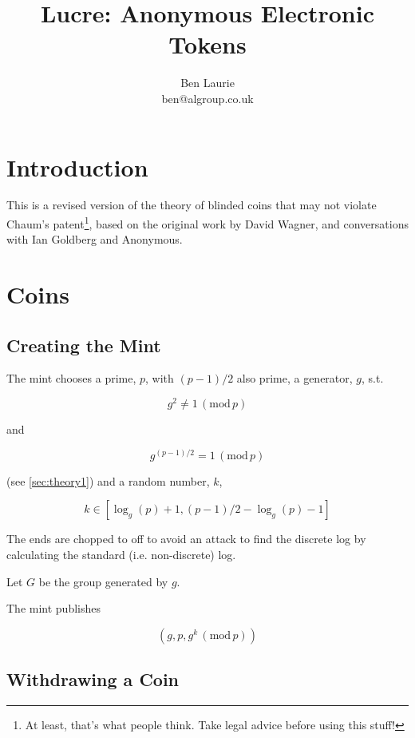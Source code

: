 \documentclass[a4paper,titlepage]{article}
\title{Lucre: Anonymous Electronic Tokens}
\author{Ben Laurie \\
ben@algroup.co.uk}
\begin{document}
\maketitle

\def\mod#1{\,(\textrm{mod}\,#1)}
\def\implies{\Rightarrow}
\def\qe#1{\begin{equation}#1\end{equation}}
\def\oneway#1{\textrm{oneway}(#1)}

\setlength{\parindent}{0pt}
\setlength{\parskip}{1ex plus 0.5ex minus 0.2ex}

\section{Introduction}

This is a revised version of the theory of blinded coins that may not
violate Chaum's patent\footnote{At least, that's what people
think. Take legal advice before using this stuff!}, based on the
original work by David Wagner, and conversations with Ian Goldberg and
Anonymous.

\section{Coins}

\subsection{Creating the Mint}

The mint chooses a prime, $p$, with $(p-1)/2$ also prime, a generator,
$g$, s.t.

\qe{g^2 \neq 1 \mod p}

and

\qe{\label{eq:1}g^{(p-1)/2} = 1 \mod p}

(see \ref{sec:theory1}) and a random number, $k$,

\qe{k \in [\log_g(p)+1,(p-1)/2-\log_g(p)-1]}

The ends are chopped to off to avoid an attack to
find the discrete log by calculating the standard (i.e. non-discrete)
log.

Let $G$ be the group generated by $g$.

The mint publishes

\qe{(g,p,g^k \mod p)}

\subsection{Withdrawing a Coin}
\end{document}
